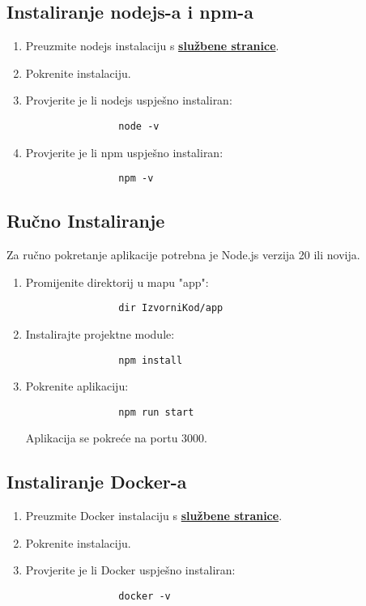 		\subsection*{Instaliranje nodejs-a i npm-a}
		\begin{enumerate}
			\item Preuzmite nodejs instalaciju s \textbf{\href{https://nodejs.org/en/download/}{službene stranice}}.
			\item Pokrenite instalaciju.
			\item Provjerite je li nodejs uspješno instaliran:
			\begin{verbatim}
				node -v
			\end{verbatim}
			\item Provjerite je li npm uspješno instaliran:
			\begin{verbatim}
				npm -v
			\end{verbatim}
		\end{enumerate}

		\subsection*{Ručno Instaliranje}
		Za ručno pokretanje aplikacije potrebna je Node.js verzija 20 ili novija.
		\begin{enumerate}
			\item Promijenite direktorij u mapu "app":
			\begin{verbatim}
				dir IzvorniKod/app 
			\end{verbatim}
			\item Instalirajte projektne module:
			\begin{verbatim}
				npm install
			\end{verbatim}
			\item Pokrenite aplikaciju:
			\begin{verbatim}
				npm run start
			\end{verbatim}
			Aplikacija se pokreće na portu 3000.
		\end{enumerate}
		
		\subsection*{Instaliranje Docker-a}
		\begin{enumerate}
			\item Preuzmite Docker instalaciju s \textbf{\href{https://docs.docker.com/get-docker/}{službene stranice}}.
			\item Pokrenite instalaciju.
			\item Provjerite je li Docker uspješno instaliran:
			\begin{verbatim}
				docker -v
			\end{verbatim}
		\end{enumerate}

